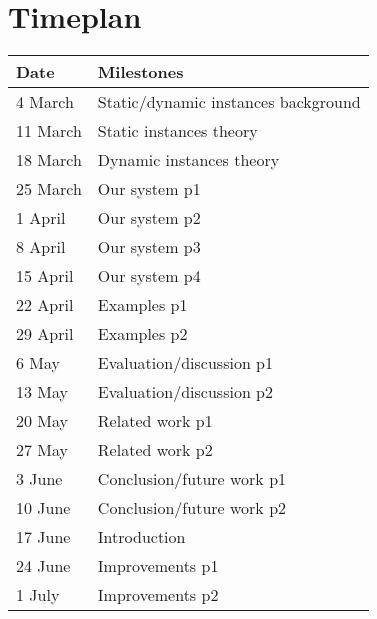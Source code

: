 \documentclass[12pt]{article}
\begin{document}
\section{Timeplan}
\begin{tabular}{ l | l }
\textbf{Date}             & \textbf{Milestones}         	   		\\ \hline
4 March 	& Static/dynamic instances background	\\ \hline
11 March 	& Static instances theory      	\\ \hline
18 March 	& Dynamic instances theory							\\ \hline
25 March 	& Our system p1						\\ \hline
1 April 	& Our system p2													\\ \hline
8 April 	& Our system p3											\\ \hline
15 April 	& Our system p4											\\ \hline
22 April 	& Examples p1											\\ \hline
29 April	& Examples p2												\\ \hline
6 May			&	Evaluation/discussion p1					\\ \hline
13 May		&	Evaluation/discussion p2					\\ \hline
20 May		&	Related work p1												\\ \hline
27 May		&	Related work p2												\\ \hline
3 June		& Conclusion/future work p1						\\ \hline
10 June		& Conclusion/future work p2						\\ \hline
17 June		& Introduction												\\ \hline
24 June		& Improvements p1												\\ \hline
1 July		& Improvements p2												\\ \hline
\end{tabular}
\end{document}
